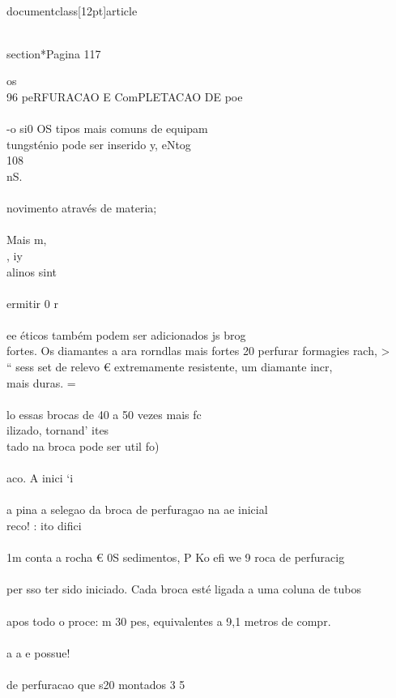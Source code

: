 \\documentclass[12pt]{article}
\begin{document}
\\section*{Pagina 117}

os\\
96 peRFURACAO E ComPLETACAO DE poe\\
\\
-o si0 OS tipos mais comuns de equipam\\
tungsténio pode ser inserido y, eNtog\\
108\\
nS.\\
\\
novimento através de materia;\\
\\
Mais m,\\
, iy\\
alinos sint\\
\\
ermitir 0 r\\
\\
ee éticos também podem ser adicionados js brog\\
fortes. Os diamantes a ara rorndlas mais fortes 20 perfurar formagies rach, >\\
“ sess set de relevo € extremamente resistente, um diamante incr,\\
mais duras. =\\
\\
lo essas brocas de 40 a 50 vezes mais fc\\
ilizado, tornand' ites\\
tado na broca pode ser util fo)\\
\\
aco. A inici ‘i\\
\\
a pina a selegao da broca de perfuragao na ae inicial \\%
reco! : ito difici\\
\\
1m conta a rocha € 0S sedimentos, P Ko efi we 9 roca de perfuracig\\
\\
per sso ter sido iniciado. Cada broca esté ligada a uma coluna de tubos\\
\\
apos todo o proce: m 30 pes, equivalentes a 9,1 metros de compr.\\
\\
a a e possue!\\
\\
de perfuracao que s20 montados 3 5\\
\end{document}
